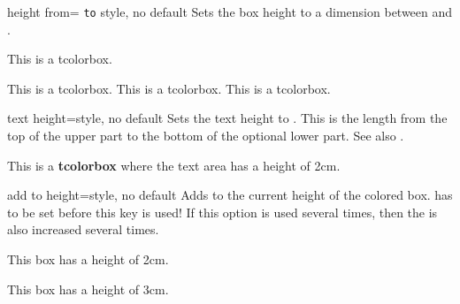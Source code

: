 \begin{docTcbKey}{height from}{= \texttt{to} }{style, no default}
  Sets the box height to a dimension between  and .
\begin{dispExample}

\begin{mybox}
This is a tcolorbox.
\end{mybox}
\begin{mybox}
This is a tcolorbox. This is a tcolorbox. This is a tcolorbox.
\end{mybox}
\begin{mybox}
\lipsum[2]
\end{mybox}
\end{dispExample}
\end{docTcbKey}


\begin{docTcbKey}[][doc new=2014-10-31]{text height}{=}{style, no default}
  Sets the text height to . This is the length from the top
  of the upper part to the bottom of the optional lower part.
  See also .
\begin{dispExample}

\begin{tcolorbox}[text height=2cm]
This is a \textbf{tcolorbox} where the text area has a height of 2cm.
\end{tcolorbox}
\end{dispExample}
\end{docTcbKey}

\clearpage

\begin{docTcbKey}[][doc new=2014-11-07]{add to height}{=}{style, no default}
  Adds  to the current height of the colored box.
   has to be set before this key is used!
  If this option is used several times, then the  is
  also increased several times.
\begin{dispExample}

\begin{tcolorbox}
  This box has a height of 2cm.
\end{tcolorbox}
\begin{tcolorbox}[add to height=1cm]
  This box has a height of 3cm.
\end{tcolorbox}
\end{dispExample}
\end{docTcbKey}


